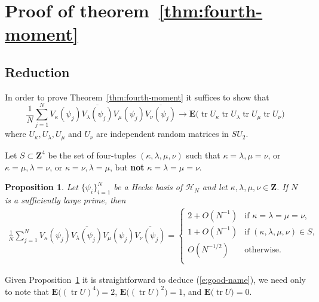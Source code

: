 \documentclass[12pt]{amsart}
\newtheorem{prop}[thm]{Proposition}%
\theoremstyle{plain}
\newcommand{\Z}{{\mathbf Z}}
\newcommand{\trace}{\operatorname{tr}}
\newcommand{\HN}{\mathcal H_N}
\renewcommand{\^}{\widehat}
\newcommand{\Ex}{\mathbf E}
\newcommand{\V}[1]{V_{#1}(\psi_j)}
\newcommand{\vnn}{\nu}
\newcommand{\vnm}{\mu}
\newcommand{\vnk}{\kappa}
\newcommand{\vnl}{\lambda}
\begin{document}

\section{Proof of theorem~\ref{thm:fourth-moment}}
\label{sec:proof-theorem-2}


\subsection{Reduction}\label{subsec:reduct}  
In order to prove Theorem~\ref{thm:fourth-moment} it suffices to show that 
\begin{equation}
\label{e:good-name}
\frac{1}{N}
\sum_{j=1}^N
\V{\vnk}
\overline{\V{\vnl}}
\V{\vnm}
\overline{\V{\vnn}}
\to 
\Ex \big(
\trace U_\vnk \trace U_\vnl 
\trace U_\vnm \trace U_\vnn \big) 
\end{equation}
where $U_\kappa, U_\lambda, U_\mu$ and $U_\nu$ are 
independent  random matrices in
$SU_2$. 






Let $S \subset \Z^4$ be the set of four-tuples
$(\vnk,\vnl,\vnm,\vnn)$ such that $\vnk=\vnl,
\vnm=\vnn$, or $\vnk=\vnm, \vnl=\vnn$, or $\vnk=\vnn,
\vnl=\vnm$, but {\bf not} $\vnk= \vnl=\vnm=\vnn$.

\begin{prop}
\label{prop:V-fourth-moment}
Let $\{\psi_i\}_{i=1}^N$ be a Hecke basis of $\HN$ and let
$\vnk,\vnl,\vnm,\vnn \in \Z$.  If $N$ is a sufficiently large prime, 
then 
\begin{multline*}
\frac{1}{N}
\sum_{j=1}^N
\V{\vnk}
\overline{\V{\vnl}}
\V{\vnm}
\overline{\V{\vnn}}
 =
\begin{cases}
2+ O(N^{-1}) & \text{if $\vnk=\vnl =\vnm = \vnn $,}\\
1+ O(N^{-1}) & \text{if $(\vnk,\vnl,\vnm,\vnn) \in S$,}\\
 O(N^{-1/2}) & \text{otherwise.}\\
\end{cases}
\end{multline*}
\end{prop}

Given Proposition~\ref{prop:V-fourth-moment} it is straightforward to
deduce (\ref{e:good-name}), we need only to note that
$\Ex \big( (\trace U)^4 \big) =2$, 
$\Ex \big( (\trace U)^2 \big) =1$, and 
$\Ex \big( \trace U \big)=0$.  
\end{document}
